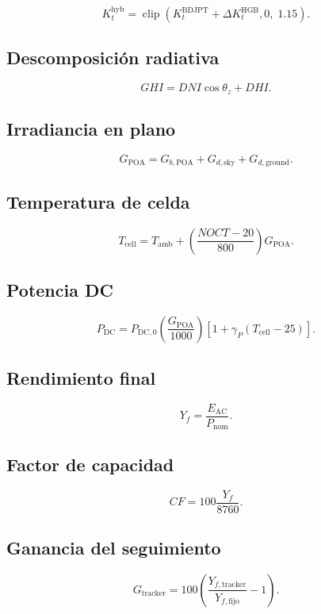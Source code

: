 \documentclass[11pt,a4paper]{article}
\begin{document}
\[
K_t^{\mathrm{hyb}}
=
\operatorname{clip}
\left(
K_t^{\mathrm{BDJPT}}+\Delta K_t^{\mathrm{HGB}},
0,\;1.15
\right).
\]

\subsection{Descomposición radiativa}

\[
GHI=DNI\cos\theta_z+DHI.
\]

\subsection{Irradiancia en plano}

\[
G_{\mathrm{POA}}
=
G_{b,\mathrm{POA}}
+
G_{d,\mathrm{sky}}
+
G_{d,\mathrm{ground}}.
\]

\subsection{Temperatura de celda}

\[
T_{\mathrm{cell}}
=
T_{\mathrm{amb}}
+
\left(
\frac{NOCT-20}{800}
\right)
G_{\mathrm{POA}}.
\]

\subsection{Potencia DC}

\[
P_{\mathrm{DC}}
=
P_{\mathrm{DC,0}}
\left(
\frac{G_{\mathrm{POA}}}{1000}
\right)
\left[
1+\gamma_P(T_{\mathrm{cell}}-25)
\right].
\]

\subsection{Rendimiento final}

\[
Y_f=\frac{E_{\mathrm{AC}}}{P_{\mathrm{nom}}}.
\]

\subsection{Factor de capacidad}

\[
CF=100\frac{Y_f}{8760}.
\]

\subsection{Ganancia del seguimiento}

\[
G_{\mathrm{tracker}}
=
100
\left(
\frac{Y_{f,\mathrm{tracker}}}{Y_{f,\mathrm{fijo}}}
-1
\right).
\]
\end{document}
